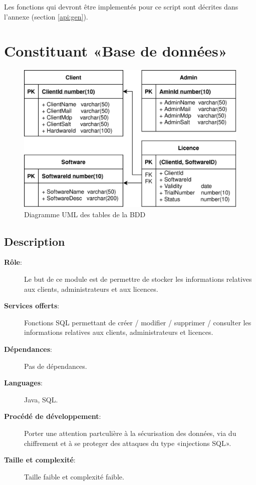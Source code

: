 Les fonctions qui devront être implementés pour ce script sont décrites dans l'annexe
(section \ref{api:gen}).
\newpage

\section{Constituant «Base de données»}

\begin{figure}[!h]
	\centering
	\includegraphics[width=\textwidth - 2cm]{../png/SQL_table.png}
	\caption{Diagramme UML des tables de la BDD}
	\label{fig:fig2}
\end{figure}

\subsection*{Description}
\begin{description}
	\item[\textbf{Rôle}:]
		Le but de ce module est de permettre de stocker les informations relatives aux
		clients, administrateurs et aux licences.
	\item[\textbf{Services offerts}:]
		Fonctions SQL permettant de créer / modifier / supprimer / consulter les
		informations relatives aux clients, administrateurs et licences.
	\item[\textbf{Dépendances}:]
		Pas de dépendances.		
	\item[\textbf{Languages}:]
		Java, SQL.
	\item[\textbf{Procédé de développement}:]
	    Porter une attention partculière à la sécurisation des données, via
	    du chiffrement et à se proteger des attaques du type «injections SQL». 
	\item[\textbf{Taille et complexité}:]
		Taille faible et complexité faible. 
\end{description}

